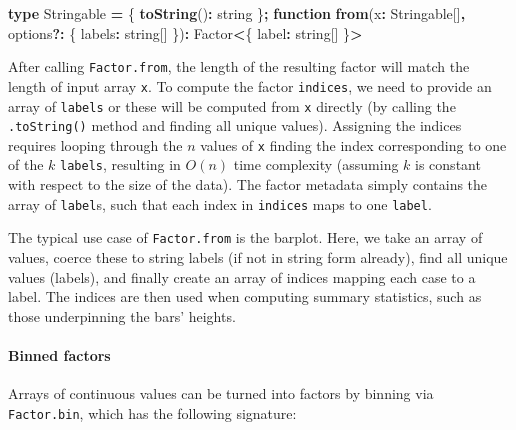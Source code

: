 \documentclass[
  openany]{book}
\newenvironment{Shaded}{\begin{snugshade}}{\end{snugshade}}
\newcommand{\DataTypeTok}[1]{\textcolor[rgb]{0.13,0.29,0.53}{#1}}
\newcommand{\FunctionTok}[1]{\textcolor[rgb]{0.13,0.29,0.53}{\textbf{#1}}}
\newcommand{\KeywordTok}[1]{\textcolor[rgb]{0.13,0.29,0.53}{\textbf{#1}}}
\newcommand{\NormalTok}[1]{#1}
\newcommand{\OperatorTok}[1]{\textcolor[rgb]{0.81,0.36,0.00}{\textbf{#1}}}
\theoremstyle{definition}
\theoremstyle{definition}
\theoremstyle{definition}
\theoremstyle{definition}
\theoremstyle{remark}
\begin{document}
\begin{Shaded}
\begin{Highlighting}[]
\KeywordTok{type}\NormalTok{ Stringable }\OperatorTok{=}\NormalTok{ \{ }\FunctionTok{toString}\NormalTok{()}\OperatorTok{:} \DataTypeTok{string}\NormalTok{ \}}\OperatorTok{;}
\KeywordTok{function} \FunctionTok{from}\NormalTok{(x}\OperatorTok{:}\NormalTok{ Stringable[]}\OperatorTok{,}\NormalTok{ options}\OperatorTok{?:}\NormalTok{ \{ labels}\OperatorTok{:} \DataTypeTok{string}\NormalTok{[] \})}\OperatorTok{:} 
\NormalTok{  Factor}\OperatorTok{\textless{}}\NormalTok{\{ label}\OperatorTok{:} \DataTypeTok{string}\NormalTok{[] \}}\OperatorTok{\textgreater{}} 
\end{Highlighting}
\end{Shaded}

After calling \texttt{Factor.from}, the length of the resulting factor will match the length of input array \texttt{x}. To compute the factor \texttt{indices}, we need to provide an array of \texttt{labels} or these will be computed from \texttt{x} directly (by calling the \texttt{.toString()} method and finding all unique values). Assigning the indices requires looping through the \(n\) values of \texttt{x} finding the index corresponding to one of the \(k\) \texttt{labels}, resulting in \(O(n)\) time complexity (assuming \(k\) is constant with respect to the size of the data). The factor metadata simply contains the array of \texttt{label}s, such that each index in \texttt{indices} maps to one \texttt{label}.

The typical use case of \texttt{Factor.from} is the barplot. Here, we take an array of values, coerce these to string labels (if not in string form already), find all unique values (labels), and finally create an array of indices mapping each case to a label. The indices are then used when computing summary statistics, such as those underpinning the bars' heights.

\paragraph{Binned factors}\label{binned-factors}

Arrays of continuous values can be turned into factors by binning via \texttt{Factor.bin}, which has the following signature:
\end{document}

